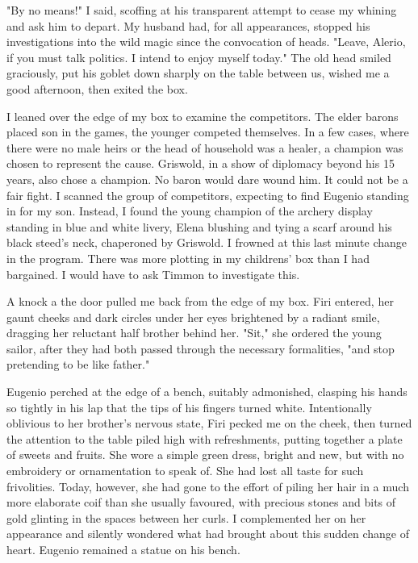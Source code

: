 \documentclass{article}
\begin{document}
"By no means!" I said, scoffing at his transparent attempt to cease my whining and ask him to depart. My husband had, for all appearances, stopped his investigations into the wild magic since the convocation of heads. "Leave, Alerio, if you must talk politics. I intend to enjoy myself today." The old head smiled graciously, put his goblet down sharply on the table between us, wished me a good afternoon, then exited the box.

I leaned over the edge of my box to examine the competitors. The elder barons placed son in the games, the younger competed themselves. In a few cases, where there were no male heirs or the head of household was a healer, a champion was chosen to represent the cause. Griswold, in a show of diplomacy beyond his 15 years, also chose a champion. No baron would dare wound him. It could not be a fair fight. I scanned the group of competitors, expecting to find Eugenio standing in for my son. Instead, I found the young champion of the archery display standing in blue and white livery, Elena blushing and tying a scarf around his black steed's neck, chaperoned by Griswold. I frowned at this last minute change in the program. There was more plotting in my childrens' box than I had bargained. I would have to ask Timmon to investigate this.

A knock a the door pulled me back from the edge of my box. Firi entered, her gaunt cheeks and dark circles under her eyes brightened by a radiant smile, dragging her reluctant half brother behind her. "Sit," she ordered the young sailor, after they had both passed through the necessary formalities, "and stop pretending to be like father."

Eugenio perched at the edge of a bench, suitably admonished, clasping his hands so tightly in his lap that the tips of his fingers turned white. Intentionally oblivious to her brother's nervous state, Firi pecked me on the cheek, then turned the attention to the table piled high with refreshments, putting together a plate of sweets and fruits. She wore a simple green dress, bright and new, but with no embroidery or ornamentation to speak of. She had lost all taste for such frivolities. Today, however, she had gone to the effort of piling her hair in a much more elaborate coif than she usually favoured, with precious stones and bits of gold glinting in the spaces between her curls. I complemented her on her appearance and silently wondered what had brought about this sudden change of heart. Eugenio remained a statue on his bench.
\end{document}
